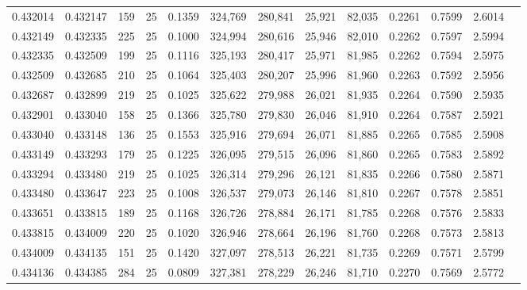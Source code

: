 \begin{tabular}{rrrrrrrrrrrrr}
0.432014 & 0.432147 &   159 &  25 &                                     0.1359 & 324,769 & 280,841 &  25,921 &  82,035 & 0.2261 & 0.7599 & 2.6014 \\
0.432149 & 0.432335 &   225 &  25 &                                     0.1000 & 324,994 & 280,616 &  25,946 &  82,010 & 0.2262 & 0.7597 & 2.5994 \\
0.432335 & 0.432509 &   199 &  25 &                                     0.1116 & 325,193 & 280,417 &  25,971 &  81,985 & 0.2262 & 0.7594 & 2.5975 \\
0.432509 & 0.432685 &   210 &  25 &                                     0.1064 & 325,403 & 280,207 &  25,996 &  81,960 & 0.2263 & 0.7592 & 2.5956 \\
0.432687 & 0.432899 &   219 &  25 &                                     0.1025 & 325,622 & 279,988 &  26,021 &  81,935 & 0.2264 & 0.7590 & 2.5935 \\
0.432901 & 0.433040 &   158 &  25 &                                     0.1366 & 325,780 & 279,830 &  26,046 &  81,910 & 0.2264 & 0.7587 & 2.5921 \\
0.433040 & 0.433148 &   136 &  25 &                                     0.1553 & 325,916 & 279,694 &  26,071 &  81,885 & 0.2265 & 0.7585 & 2.5908 \\
0.433149 & 0.433293 &   179 &  25 &                                     0.1225 & 326,095 & 279,515 &  26,096 &  81,860 & 0.2265 & 0.7583 & 2.5892 \\
0.433294 & 0.433480 &   219 &  25 &                                     0.1025 & 326,314 & 279,296 &  26,121 &  81,835 & 0.2266 & 0.7580 & 2.5871 \\
0.433480 & 0.433647 &   223 &  25 &                                     0.1008 & 326,537 & 279,073 &  26,146 &  81,810 & 0.2267 & 0.7578 & 2.5851 \\
0.433651 & 0.433815 &   189 &  25 &                                     0.1168 & 326,726 & 278,884 &  26,171 &  81,785 & 0.2268 & 0.7576 & 2.5833 \\
0.433815 & 0.434009 &   220 &  25 &                                     0.1020 & 326,946 & 278,664 &  26,196 &  81,760 & 0.2268 & 0.7573 & 2.5813 \\
0.434009 & 0.434135 &   151 &  25 &                                     0.1420 & 327,097 & 278,513 &  26,221 &  81,735 & 0.2269 & 0.7571 & 2.5799 \\
0.434136 & 0.434385 &   284 &  25 &                                     0.0809 & 327,381 & 278,229 &  26,246 &  81,710 & 0.2270 & 0.7569 & 2.5772 \\

\end{tabular}
